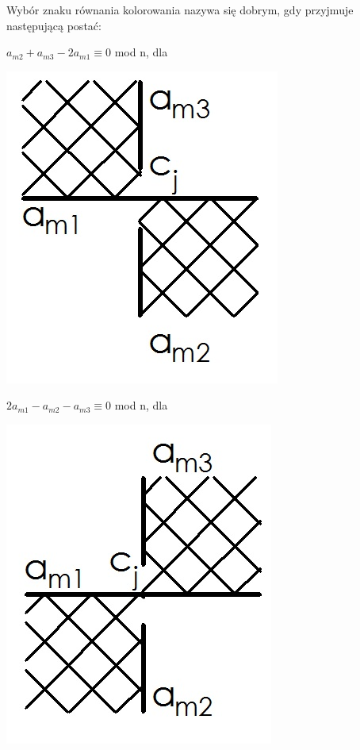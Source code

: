 \begin{definicja}
Wybór znaku równania kolorowania nazywa się dobrym, gdy przyjmuje następującą postać: 
\end{definicja}

	\begin{minipage}{0.5\textwidth}
$a_{m2}+a_{m3}-2a_{m1} \equiv 0$ mod n, dla \\	
	\begin{center}
			\includegraphics[scale=0.3]{2/Obrazy/Cros+}
	\end{center}
	\end{minipage}
	\begin{minipage}{0.5\textwidth}
$2a_{m1}-a_{m2}-a_{m3} \equiv 0$ mod n, dla \\
	\begin{center}
			\includegraphics[scale=0.3]{2/Obrazy/Cros-}
	\end{center}	
	\end{minipage}

